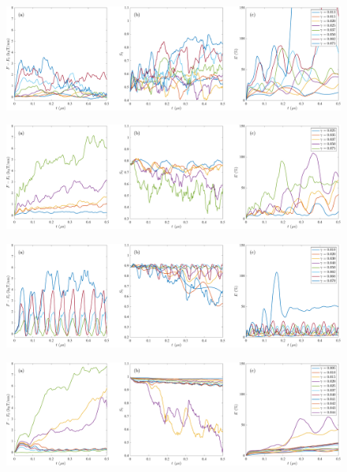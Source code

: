 \begin{figure}[h!]
\begin{center}
\includegraphics[width=\textwidth]{SMFigures/ULShRaw.pdf}
\end{center}
\caption{}
\label{fig:ulshraw}
\end{figure}



\begin{figure}[h!]
\begin{center}
\includegraphics[width=\textwidth]{SMFigures/MLShRaw.pdf}
\end{center}
\caption{}
\label{fig:mlshraw}
\end{figure}


\begin{figure}[h!]
\begin{center}
\includegraphics[width=\textwidth]{SMFigures/StShRaw.pdf}
\end{center}
\caption{}
\label{fig:stshraw}
\end{figure}


\begin{figure}[h!]
\begin{center}
\includegraphics[width=\textwidth]{SMFigures/VeTGRaw.pdf}
\end{center}
\caption{}
\label{fig:vetgraw}
\end{figure}



